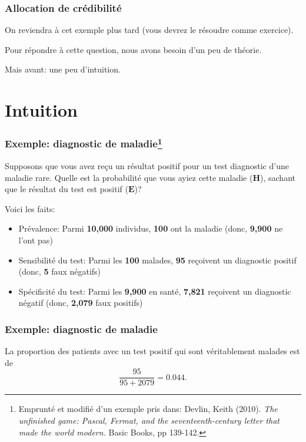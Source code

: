 \documentclass{beamer}
\begin{document}
\begin{frame}
    \frametitle{Allocation de crédibilité}
    On reviendra à cet exemple plus tard (vous devrez le résoudre comme exercice).

    \pause

    \vfill

    Pour répondre à cette question, nous avons besoin d'un peu de théorie.

    \pause

    \vfill

    Mais avant: une peu d'intuition.
\end{frame}



\section{Intuition}

\begin{frame}
    \frametitle{Exemple: diagnostic de maladie\footnote{
        Emprunté et modifié d'un exemple pris dans: Devlin, Keith (2010).
        \emph{The unfinished game: Pascal, Fermat, and the seventeenth-century letter that made the world modern.}
        Basic Books, pp 139-142.
    }}
    Supposons que vous avez reçu un résultat positif pour un test diagnostic d'une maladie rare.
    Quelle est la probabilité que vous ayiez cette maladie ($\boldsymbol{H}$),
    sachant que le résultat du test est positif ($\boldsymbol{E}$)?

    \pause

    \vfill

    Voici les faits:
    \begin{itemize}
      \item Prévalence: Parmi \textbf{10,000} individus, \textbf{100} ont la maladie (donc, \textbf{9,900} ne l'ont pas)
      \pause
      \item Sensibilité du test: Parmi les \textbf{100} malades,
            \textbf{95} reçoivent un diagnostic positif (donc, \textbf{5} faux négatifs)
      \pause
      \item Spécificité du test: Parmi les \textbf{9,900} en santé,
            \textbf{7,821} reçoivent un diagnostic négatif (donc, \textbf{2,079} faux positifs)
    \end{itemize}
\end{frame}


\begin{frame}
    \frametitle{Exemple: diagnostic de maladie}
    \begin{figure}
      \centering
      \scalebox{0.75}{}
    \end{figure}

    \pause

    La proportion des patients avec un test positif qui sont véritablement malades est de
    \[\frac{95}{95 + 2079} = 0.044 .\]
\end{frame}
\end{document}
